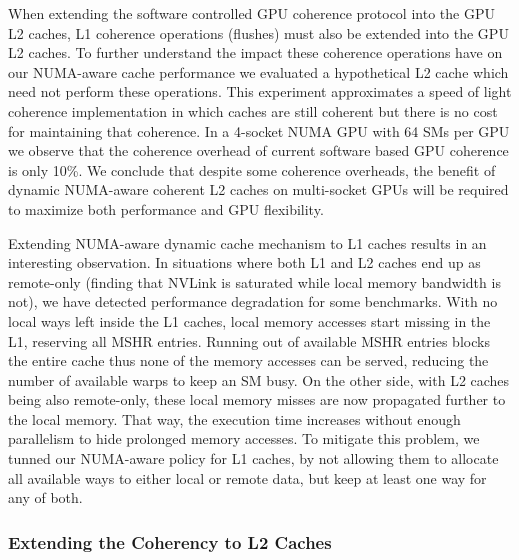 When extending the software controlled GPU coherence protocol into the GPU L2 
caches, L1 coherence operations (flushes) must also be extended into the GPU 
L2 caches.  To further understand the impact these coherence operations have on our 
NUMA-aware cache performance we evaluated a hypothetical L2 cache which need not 
perform these operations.  This experiment approximates a 
speed of light coherence implementation in which caches are still coherent 
but there is no cost for maintaining that coherence. In a 4-socket NUMA GPU 
with 64 SMs per GPU we observe that the coherence overhead of current 
software based GPU coherence is only 10\%. We conclude that despite some 
coherence overheads, the benefit of dynamic NUMA-aware coherent L2 caches on 
multi-socket GPUs will be required to maximize both performance and GPU 
flexibility. 

Extending NUMA-aware dynamic cache mechanism to L1 caches results in an 
interesting observation. In situations where both L1 and L2 caches end up as 
remote-only (finding that NVLink is saturated while local memory bandwidth is 
not), we have detected performance degradation for some benchmarks. With no 
local ways left inside the L1 caches, local memory accesses start missing in 
the L1, reserving all MSHR entries. Running out of available MSHR entries 
blocks the entire cache thus none of the memory accesses can be served, 
reducing the number of available warps to keep an SM busy. On the other side, 
with L2 caches being also remote-only, these local memory misses are now 
propagated further to the local memory. That way, the execution time 
increases without enough parallelism to hide prolonged memory accesses. To 
mitigate this problem, we tunned our NUMA-aware policy for L1 caches, by not 
allowing them to allocate all available ways to either local or remote data, 
but keep at least one way for any of both. 

\subsubsection{Extending the Coherency to L2 Caches}



